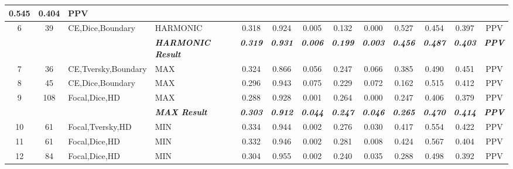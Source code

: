 \begin{table}[H]
{\begin{tabular}{ccl|l|c|c|c|c|c|c|c|c|c|}
    0.545 &
    0.404 &
    PPV \\ \hline
  \multicolumn{1}{|c|}{6} &
    \multicolumn{1}{c|}{39} &
    CE,Dice,Boundary &
    HARMONIC &
    0.318 &
    0.924 &
    0.005 &
    0.132 &
    0.000 &
    0.527 &
    0.454 &
    0.397 &
    PPV \\ \hline
  \textbf{} &
    \textit{\textbf{}} &
    \textbf{} &
    \textit{\textbf{HARMONIC Result}} &
    \textit{\textbf{0.319}} &
    \textit{\textbf{0.931}} &
    \textit{\textbf{0.006}} &
    \textit{\textbf{0.199}} &
    \textit{\textbf{0.003}} &
    \textit{\textbf{0.456}} &
    \textit{\textbf{0.487}} &
    \textit{\textbf{0.403}} &
    \textit{\textbf{PPV}} \\ \hline
  \multicolumn{1}{|c|}{7} &
    \multicolumn{1}{c|}{36} &
    CE,Tversky,Boundary &
    MAX &
    0.324 &
    0.866 &
    0.056 &
    0.247 &
    0.066 &
    0.385 &
    0.490 &
    0.451 &
    PPV \\ \hline
  \multicolumn{1}{|c|}{8} &
    \multicolumn{1}{c|}{45} &
    CE,Dice,Boundary &
    MAX &
    0.296 &
    0.943 &
    0.075 &
    0.229 &
    0.072 &
    0.162 &
    0.515 &
    0.412 &
    PPV \\ \hline
  \multicolumn{1}{|c|}{9} &
    \multicolumn{1}{c|}{108} &
    Focal,Dice,HD &
    MAX &
    0.288 &
    0.928 &
    0.001 &
    0.264 &
    0.000 &
    0.247 &
    0.406 &
    0.379 &
    PPV \\ \hline
  \textbf{} &
    \textit{\textbf{}} &
    \textbf{} &
    \textit{\textbf{MAX Result}} &
    \textit{\textbf{0.303}} &
    \textit{\textbf{0.912}} &
    \textit{\textbf{0.044}} &
    \textit{\textbf{0.247}} &
    \textit{\textbf{0.046}} &
    \textit{\textbf{0.265}} &
    \textit{\textbf{0.470}} &
    \textit{\textbf{0.414}} &
    \textit{\textbf{PPV}} \\ \hline
  \multicolumn{1}{|c|}{10} &
    \multicolumn{1}{c|}{61} &
    Focal,Tversky,HD &
    MIN &
    0.334 &
    0.944 &
    0.002 &
    0.276 &
    0.030 &
    0.417 &
    0.554 &
    0.422 &
    PPV \\ \hline
  \multicolumn{1}{|c|}{11} &
    \multicolumn{1}{c|}{61} &
    Focal,Dice,HD &
    MIN &
    0.332 &
    0.946 &
    0.002 &
    0.281 &
    0.008 &
    0.424 &
    0.567 &
    0.404 &
    PPV \\ \hline
  \multicolumn{1}{|c|}{12} &
    \multicolumn{1}{c|}{84} &
    Focal,Dice,HD &
    MIN &
    0.304 &
    0.955 &
    0.002 &
    0.240 &
    0.035 &
    0.288 &
    0.498 &
    0.392 &
    PPV \\ \hline

\end{tabular}}
\end{table}

